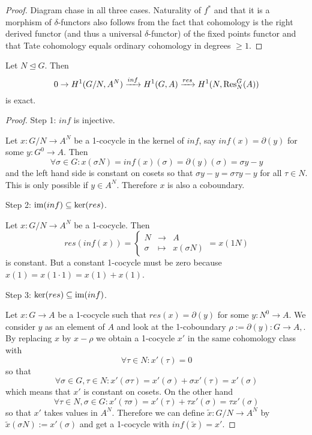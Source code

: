 \documentclass[fontsize=11pt,fleqn,a4paper]{scrartcl}
\begin{document}
\begin{proof}
Diagram chase in all three cases. Naturality of $f^\ast$ and that it is a morphism of $\delta$-functors also follows from the fact that cohomology is the right derived functor (and thus a universal $\delta$-functor) of the fixed points functor and that Tate cohomology equals ordinary cohomology in degrees $\geq 1$.
\end{proof}

\begin{theorem}
Let $N\unlhd G$. Then
\[ 0 \to H^1(G/N,A^N) \xrightarrow{inf} H^1(G,A) \xrightarrow{res} H^1 (N,\operatorname{Res}_N^G(A))\]
is exact.
\end{theorem}
\begin{proof}
Step 1: $inf$ is injective.

Let $x: G/N\to A^N$ be a 1-cocycle in the kernel of $inf$, say $inf(x)=\partial(y)$ for some $y: G^0\to A$. Then
\[\forall \sigma\in G: x(\sigma N) = inf(x)(\sigma) = \partial(y)(\sigma) = \sigma y-y\]
and the left hand side is constant on cosets so that $\sigma y - y = \sigma\tau y - y$ for all $\tau\in N$. This is only possible if $y\in A^N$. Therefore $x$ is also a coboundary.

\medbreak
Step 2: $\operatorname{im}(inf)\subseteq\ker(res)$.

Let $x: G/N\to A^N$ be a 1-cocycle. Then
\[res(inf(x)) = \left\{\begin{array}{rcl} N&\to&A \\ \sigma&\mapsto&x(\sigma N)\end{array}\right. = x(1N)\]
is constant. But a constant 1-cocycle must be zero because $x(1) = x(1\cdot 1) = x(1)+x(1)$.

\medbreak
Step 3: $\ker(res)\subseteq\operatorname{im}(inf)$.

Let $x: G\to A$ be a 1-cocycle such that $res(x)=\partial(y)$ for some $y: N^0\to A$. We consider $y$ as an element of $A$ and look at the 1-coboundary $\rho:=\partial(y): G\to A, $. By replacing $x$ by $x-\rho$ we obtain a 1-cocycle $x'$ in the same cohomology class with
\[\forall\tau\in N: x'(\tau) = 0\]
so that
\[\forall\sigma\in G,\tau\in N: x'(\sigma\tau) = x'(\sigma)+\sigma x'(\tau) = x'(\sigma)\]
which means that $x'$ is constant on cosets. On the other hand
\[\forall\tau\in N,\sigma\in G: x'(\tau\sigma) = x'(\tau) + \tau x'(\sigma) = \tau x'(\sigma)\]
so that $x'$ takes values in $A^N$. Therefore we can define $\tilde{x}: G/N\to A^N$ by $\tilde{x}(\sigma N):=x'(\sigma)$ and get a 1-cocycle with $inf(\tilde{x}) = x'$.
\end{proof}
\end{document}
